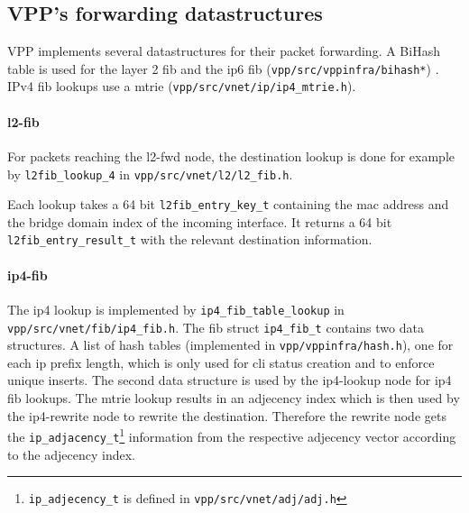  
\subsection{VPP's forwarding datastructures}

VPP implements several datastructures for their packet forwarding. A
BiHash table is used for the layer 2 \Ac{fib} and the ip6 \Ac{fib}
(\lstinline|vpp/src/vppinfra/bihash*|) \cite{vppwiki:bihash}. IPv4 \Ac{fib}
lookups use a mtrie (\lstinline|vpp/src/vnet/ip/ip4_mtrie.h|).


\paragraph{l2-fib}

For packets reaching the l2-fwd node, the destination lookup is done
for example by \lstinline|l2fib_lookup_4| in
\lstinline|vpp/src/vnet/l2/l2_fib.h|. 

Each lookup takes a 64 bit \lstinline|l2fib_entry_key_t| containing
the mac address and the bridge domain index of the incoming interface.
It returns a 64 bit \lstinline|l2fib_entry_result_t| with the relevant
destination information. 


\paragraph{ip4-fib}





The ip4 lookup is implemented by \lstinline|ip4_fib_table_lookup| in
\lstinline|vpp/src/vnet/fib/ip4_fib.h|. The \Ac{fib} struct
\lstinline|ip4_fib_t| contains two data structures. A list of hash
tables (implemented in \lstinline|vpp/vppinfra/hash.h|), one for each
ip prefix length, which is only used for \Ac{cli} status creation and
to enforce unique inserts. The second data structure is used by the
ip4-lookup node for ip4 \Ac{fib} lookups. The mtrie lookup results in
an adjecency index which is then used by the ip4-rewrite node to
rewrite the destination. Therefore the rewrite node gets the
\lstinline|ip_adjacency_t|\footnote{\lstinline|ip_adjecency_t| is
defined in \lstinline|vpp/src/vnet/adj/adj.h|} information from the
respective adjecency vector according to the adjecency index.

